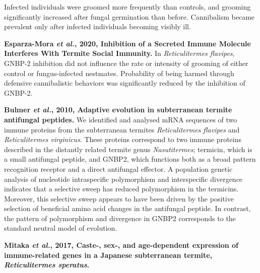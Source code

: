 \documentclass[11pt]{article}
\begin{document}
\begin{sloppypar}
Infected individuals were groomed more frequently than controls, and grooming significantly increased after fungal germination than before. 
Cannibalism became prevalent only after infected individuals becoming visibly ill. 
\par
\textbf{Esparza-Mora \textit{et al.}, 2020, Inhibition of a Secreted Immune Molecule Interferes With Termite Social Immunity.} \newline
In \textit{Reticulitermes flavipes}, GNBP-2 inhibition did not influence the rate or intensity of grooming of either control or fungus-infected nestmates. 
Probability of being harmed through defensive cannibalistic behaviors was significantly reduced by the inhibition of GNBP-2. 
\par
\textbf{Bulmer \textit{et al.}, 2010, Adaptive evolution in subterranean termite antifungal peptides.} \newline
We identified and analysed mRNA sequences of two immune proteins from the subterranean termites \textit{Reticulitermes flavipes} and \textit{Reticulitermes virginicus}. 
These proteins correspond to two immune proteins described in the distantly related termite genus \textit{Nasutitermes}; termicin, which is a small antifungal peptide, and GNBP2, which functions both as a broad pattern recognition receptor and a direct antifungal effector. 
A population genetic analysis of nucleotide intraspecific polymorphism and interspecific divergence indicates that a selective sweep has reduced polymorphism in the termicins. 
Moreover, this selective sweep appears to have been driven by the positive selection of beneficial amino acid changes in the antifungal peptide. 
In contrast, the pattern of polymorphism and divergence in GNBP2 corresponds to the standard neutral model of evolution.
\par
\textbf{Mitaka \textit{et al.}, 2017, Caste-, sex-, and age-dependent expression of immune-related genes in a Japanese subterranean termite, \textit{Reticulitermes speratus}.} \newline


\end{sloppypar}
\end{document}
